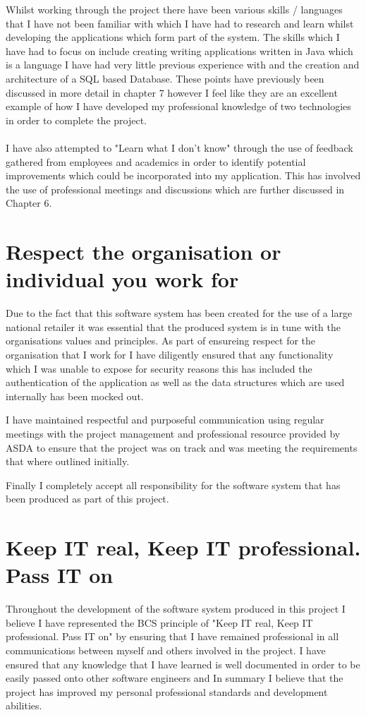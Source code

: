 \documentclass[a4paper,11pt]{report}
\begin{document}
Whilst working through the project there have been various skills / languages that I have not been familiar with which I have had
to research and learn whilst developing the applications which form part of the system. The skills which I have had to focus on include
creating writing applications written in Java which is a language I have had very little previous experience with and the creation and architecture of a SQL based Database.
These points have previously been discussed in more detail in chapter 7 however I feel like they are an excellent example of how 
I have developed my professional knowledge of two technologies in order to complete the project.
\\
\\
I have also attempted to "Learn what I don't know" through the use of feedback gathered from employees and academics 
in order to identify potential improvements which could be incorporated into my application. 
This has involved the use of professional meetings and discussions which are further discussed in Chapter 6.


\section{Respect the organisation or individual you work for}
Due to the fact that this software system has been created for the use of a large national retailer it was essential that the produced system is in tune with the organisations values and principles. 
As part of ensureing respect for the organisation that I work for I have diligently ensured that any functionality which I was unable to expose for security reasons this has included the authentication of the application as well as the data structures which are used internally has been mocked out.

I have maintained respectful and purposeful communication using regular meetings with the project management and professional resource provided by ASDA to ensure that the project was on track and was meeting the requirements that where outlined initially.

Finally I completely accept all responsibility for the software system that has been produced as part of this project. 

\section{Keep IT real, Keep IT professional. Pass IT on}
Throughout the development of the software system produced in this project I believe I have represented the BCS principle of 
"Keep IT real, Keep IT professional. Pass IT on" by ensuring that I have remained professional in all communications between
myself and others involved in the project. I have ensured that any knowledge that I have learned is well documented in order
to be easily passed onto other software engineers and In summary I believe that the project has improved my personal professional
standards and development abilities.
\end{document}
